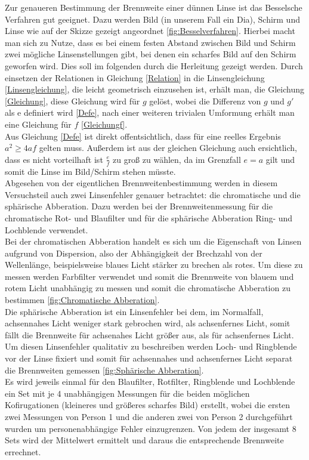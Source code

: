 Zur genaueren Bestimmung der Brennweite einer dünnen Linse ist das Besselsche Verfahren gut geeignet. Dazu werden Bild (in unserem Fall ein Dia), Schirm und Linse wie auf der Skizze gezeigt angeordnet \ref{fig:Besselverfahren}. Hierbei macht man sich zu Nutze, dass es bei einem festen Abstand zwischen Bild und Schirm zwei mögliche Linsenstellungen gibt, bei denen ein scharfes Bild auf den Schirm geworfen wird. Dies soll im folgenden durch die Herleitung gezeigt werden. Durch einsetzen der Relationen in Gleichung \ref{Relation} in die Linsengleichung \ref{Linsengleichung}, die leicht geometrisch einzusehen ist, erhält man, die Gleichung \ref{Gleichung}, diese Gleichung wird für $g$ gelöst, wobei die Differenz von $g$ und $g'$ als e definiert wird \ref{Defe}, nach einer weiteren trivialen Umformung erhält man eine Gleichung für $f$ \ref{Gleichungf}.\\
Aus Gleichung \ref{Defe} ist direkt offentsichtlich, dass für eine reelles Ergebnis $a^2 \geq 4af$ gelten muss. Außerdem ist aus der gleichen Gleichung auch ersichtlich, dass es nicht vorteilhaft ist $\frac{e}{f}$ zu groß zu wählen, da im Grenzfall $e = a$ gilt und somit die Linse im Bild/Schirm stehen müsste. \\
Abgesehen von der eigentlichen Brennweitenbestimmung werden in diesem Versuchsteil auch zwei Linsenfehler genauer betrachtet: die chromatische und die sphärische Abberation. Dazu werden bei der Brennweitenmessung für die chromatische Rot- und Blaufilter und für die sphärische Abberation Ring- und Lochblende verwendet.\\
Bei der chromatischen Abberation handelt es sich um die Eigenschaft von Linsen aufgrund von Dispersion, also der Abhängigkeit der Brechzahl von der Wellenlänge, beispielsweise blaues Licht stärker zu brechen als rotes. Um diese zu messen werden Farbfilter verwendet und somit die Brennweite von blauem und rotem Licht unabhängig zu messen und somit die chromatische Abberation zu bestimmen \ref{fig:Chromatische Abberation}.\\
Die sphärische Abberation ist ein Linsenfehler bei dem, im Normalfall, achsennahes Licht weniger stark gebrochen wird, als achsenfernes Licht, somit fällt die Brennweite für achsenahes Licht größer aus, als für achsenfernes Licht. Um diesen Linsenfehler qualitativ zu beschreiben werden Loch- und Ringblende vor der Linse fixiert und somit für achsennahes und achsenfernes Licht separat die Brennweiten gemessen \ref{fig:Sphärische Abberation}.\\
Es wird jeweils einmal für den Blaufilter, Rotfilter, Ringblende und Lochblende ein Set mit je 4 unabhängigen Messungen für die beiden möglichen Kofirugationen (kleineres und größeres scharfes Bild) erstellt, wobei die ersten zwei Messungen von Person 1 und die anderen zwei von Person 2 durchgeführt wurden um personenabhängige Fehler einzugrenzen. Von jedem der insgesamt 8 Sets wird der Mittelwert ermittelt und daraus die entsprechende Brennweite errechnet.

